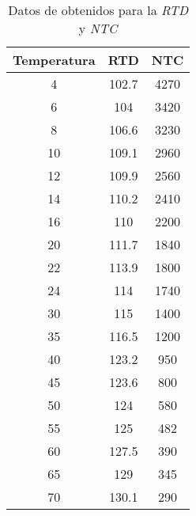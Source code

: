 \begin{table}[H]
\setlength{\tabcolsep}{18pt}
\centering
\begin{tabular}{ c | c c }
Temperatura & RTD & NTC \\
\hline
4 & 102.7 & 4270 \\
6 & 104 & 3420 \\
8 & 106.6 & 3230 \\
10 & 109.1 & 2960 \\
12 & 109.9 & 2560 \\
14 & 110.2 & 2410 \\
16 & 110 & 2200 \\
20 & 111.7 & 1840 \\
22 & 113.9 & 1800 \\
24 & 114 & 1740 \\
30 & 115 & 1400 \\
35 & 116.5 & 1200 \\
40 & 123.2 & 950 \\
45 & 123.6 & 800 \\
50 & 124 & 580 \\
55 & 125 & 482 \\
60 & 127.5 & 390 \\
65 & 129 & 345 \\
70 & 130.1 & 290 \\
\end{tabular}
\caption{Datos de obtenidos para la \textit{RTD} y \textit{NTC}}
\label{tab:temp_data}
\end{table}

